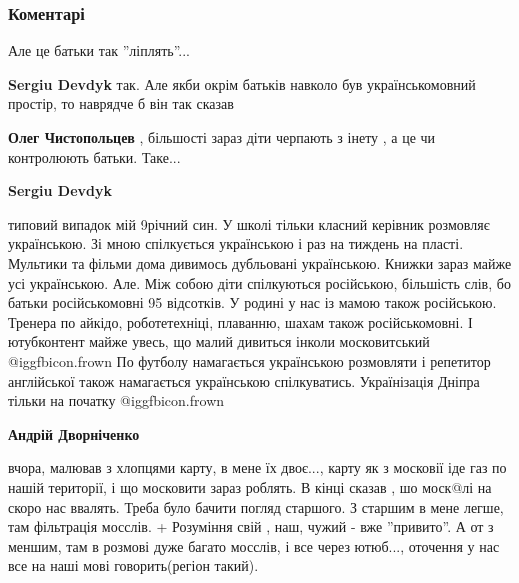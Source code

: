  
 
 
 
 
\subsubsection{Коментарі}
\label{sec:16_10_2021.fb.chistopolcev_oleg.1.istoria_park_shevchenko_mova_rebenok.cmt}

\begin{itemize} %
Але це батьки так ''ліплять''...

\begin{itemize} %
\textbf{Sergiu Devdyk} так. Але якби окрім батьків навколо був українськомовний простір, то наврядче б він так сказав

\textbf{Олег Чистопольцев} , більшості зараз діти черпають з інету , а це чи контролюють батьки. Таке...

\textbf{Sergiu Devdyk} 

типовий випадок мій 9річний син. У школі тільки класний керівник розмовляє українською.
Зі мною спілкується українською і раз на тиждень на пласті.
Мультики та фільми дома дивимось дубльовані українською.
Книжки зараз майже усі українською.
Але.
Між собою діти спілкуються російською, більшість слів, бо батьки російськомовні 95 відсотків.
У родині у нас із мамою також російською.
Тренера по айкідо, роботетехніці, плаванню, шахам також російськомовні.
І ютубконтент майже увесь, що малий дивиться інколи московитський  @igg{fbicon.frown} 
По футболу намагається українською розмовляти і репетитор англійської також намагається українською спілкуватись.
Українізація Дніпра тільки на початку  @igg{fbicon.frown} 

\textbf{Андрій Дворніченко} 

вчора, малював з хлопцями карту, в мене їх двоє..., карту як з московії іде газ
по нашій території, і що московити зараз роблять. В кінці сказав , шо моск@лі
на скоро нас ввалять. Треба було бачити погляд старшого. З старшим в мене
легше, там фільтрація мосслів. + Розуміння свій , наш, чужий - вже ''привито''.
А от з меншим, там в розмові дуже багато мосслів, і все через ютюб..., оточення
у нас все на наші мові говорить(регіон такий).


\end{itemize}
\end{itemize}
